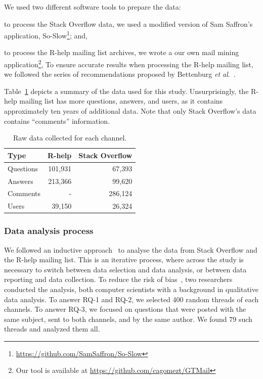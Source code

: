 We used two different software tools to prepare the data:
    \begin{enumerate*}[label=(\arabic*)]
    \item to process the Stack Overflow data, we used a modified version of Sam Saffron's application, So-Slow\footnote{\url{https://github.com/SamSaffron/So-Slow}}; and,
    \item to process the R-help mailing list archives, we wrote a our own mail mining application\footnote{Our tool is available at
            \url{https://github.com/cagomezt/GTMail}}, To ensure accurate results when processing the R-help mailing list, we followed the series of recommendations proposed by Bettenburg \textit{et al}.~\cite{Bettenburg2009}.
    \end{enumerate*}
Table~\ref{table:data} depicts a summary of the data used for this study. Unsurprisingly, the R-help mailing list has more questions, answers, and users, as it contains approximately ten years of additional data.
Note that only Stack Overflow's data contains ``comments'' information.

	\begin{table}[!htb]
	  \centering
      \caption{Raw data collected for each channel.}
      \begin{small}
        \begin{tabular}{lrr}
	        \toprule
	        Type          &  R-help & Stack Overflow \\
	        \midrule
	        Questions     & 101,931 &  67,393 \\
	        Answers       & 213,366 &  99,620 \\
	        Comments      &       - & 286,124 \\
	        Users         &  39,150 &  26,324 \\
	        \bottomrule
        \end{tabular}
      \end{small}
	  \label{table:data}
	\end{table}





\subsubsection{Data analysis process}
\label{sec:dap}

We followed an inductive approach~\cite{Runeson2012} to analyse the data from Stack Overflow and the R-help mailing list. This is an iterative process, where  across the study is necessary to switch between data selection and data analysis, or between data reporting and data collection. To reduce the risk of bias~\cite{Runeson2012}, two researchers conducted the analysis, both computer scientists with a background in qualitative data analysis. To answer RQ-1 and RQ-2, we selected 400 random threads of each channels. To answer RQ-3, we focused on questions that were posted with the same subject, sent to both channels, and by the same author. We found 79 such threads and analyzed them all.
    
